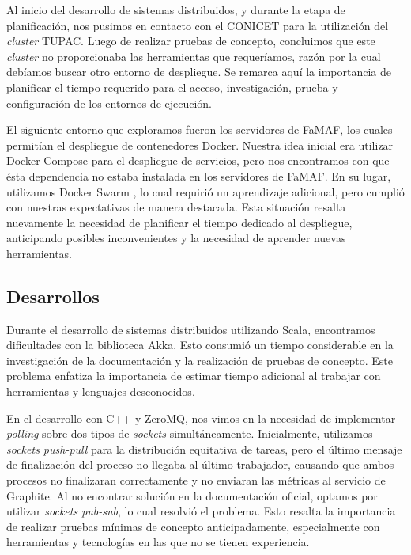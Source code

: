 \documentclass[11pt]{article}
\let\Oldsubsection\subsection
\renewcommand{\subsection}{\FloatBarrier\Oldsubsection}
\newcommand{\english}[1]{\textit{#1}}
\begin{document}
Al inicio del desarrollo de sistemas distribuidos, y durante la etapa de planificación, nos pusimos en contacto con el CONICET para la utilización del \english{cluster} TUPAC. Luego de realizar pruebas de concepto, concluimos que este \english{cluster} no proporcionaba las herramientas que requeríamos, razón por la cual debíamos buscar otro entorno de despliegue. Se remarca aquí la importancia de planificar el tiempo requerido para el acceso, investigación, prueba y configuración de los entornos de ejecución. 

El siguiente entorno que exploramos fueron los servidores de FaMAF, los cuales permitían el despliegue de contenedores Docker. Nuestra idea inicial era utilizar Docker Compose \cite{com:docker-compose} para el despliegue de servicios, pero nos encontramos con que ésta dependencia no estaba instalada en los servidores de FaMAF. En su lugar, utilizamos Docker Swarm \cite{com:docker-swarm}, lo cual requirió un aprendizaje adicional, pero cumplió con nuestras expectativas de manera destacada. Esta situación resalta nuevamente la necesidad de planificar el tiempo dedicado al despliegue, anticipando posibles inconvenientes y la necesidad de aprender nuevas herramientas.

\subsection{Desarrollos}

Durante el desarrollo de sistemas distribuidos utilizando Scala, encontramos dificultades con la biblioteca Akka. Esto consumió un tiempo considerable en la investigación de la documentación y la realización de pruebas de concepto. Este problema enfatiza la importancia de estimar tiempo adicional al trabajar con herramientas y lenguajes desconocidos.

En el desarrollo con C++ y ZeroMQ, nos vimos en la necesidad de implementar \english{polling} sobre dos tipos de \textit{sockets} simultáneamente. Inicialmente, utilizamos \textit{sockets push-pull} para la distribución equitativa de tareas, pero el último mensaje de finalización del proceso no llegaba al último trabajador, causando que ambos procesos no finalizaran correctamente y no enviaran las métricas al servicio de Graphite. Al no encontrar solución en la documentación oficial, optamos por utilizar \textit{sockets pub-sub}, lo cual resolvió el problema. Esto resalta la importancia de realizar pruebas mínimas de concepto anticipadamente, especialmente con herramientas y tecnologías en las que no se tienen experiencia.
\end{document}
